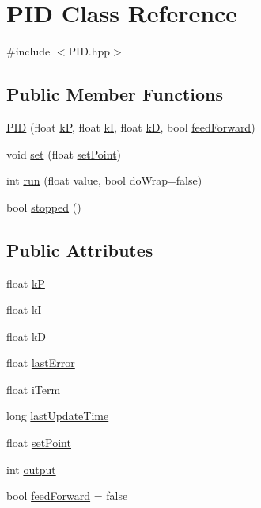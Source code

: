 \hypertarget{classPID}{\section{P\-I\-D Class Reference}
\label{classPID}
}


{\ttfamily \#include $<$P\-I\-D.\-hpp$>$}

\subsection*{Public Member Functions}
\begin{DoxyCompactItemize}
\item 
\hyperlink{classPID_acf0310be28ae782627e1671f4a663543}{P\-I\-D} (float \hyperlink{classPID_ac4815cca85109a6e13b10c2415104328}{k\-P}, float \hyperlink{classPID_ac686925341bcab06b11df109533b6807}{k\-I}, float \hyperlink{classPID_a5a07dca1e267a62af08ebd07781f1e9e}{k\-D}, bool \hyperlink{classPID_aaad110febd9150a54528b9cb6ff145e8}{feed\-Forward})
\item 
void \hyperlink{classPID_ac42a9b324383cc5ba0fec0f3ff41913e}{set} (float \hyperlink{classPID_aab66dffb3291ee486568e8b73cb71831}{set\-Point})
\item 
int \hyperlink{classPID_a787c74101b0fed1eba2df4d82000028e}{run} (float value, bool do\-Wrap=false)
\item 
bool \hyperlink{classPID_a443ba218324fabf44754b1bab2be5fd6}{stopped} ()
\end{DoxyCompactItemize}
\subsection*{Public Attributes}
\begin{DoxyCompactItemize}
\item 
float \hyperlink{classPID_ac4815cca85109a6e13b10c2415104328}{k\-P}
\item 
float \hyperlink{classPID_ac686925341bcab06b11df109533b6807}{k\-I}
\item 
float \hyperlink{classPID_a5a07dca1e267a62af08ebd07781f1e9e}{k\-D}
\item 
float \hyperlink{classPID_abf0cc22331707048925c27a242be7d3e}{last\-Error}
\item 
float \hyperlink{classPID_a940a94095581f2d32d1ed3426a2cdf4b}{i\-Term}
\item 
long \hyperlink{classPID_ac544c553fc46b395600413117df8a1f8}{last\-Update\-Time}
\item 
float \hyperlink{classPID_aab66dffb3291ee486568e8b73cb71831}{set\-Point}
\item 
int \hyperlink{classPID_a34f2887b625d8d49e546b4e2fb389d04}{output}
\item 
bool \hyperlink{classPID_aaad110febd9150a54528b9cb6ff145e8}{feed\-Forward} = false
\end{DoxyCompactItemize}


